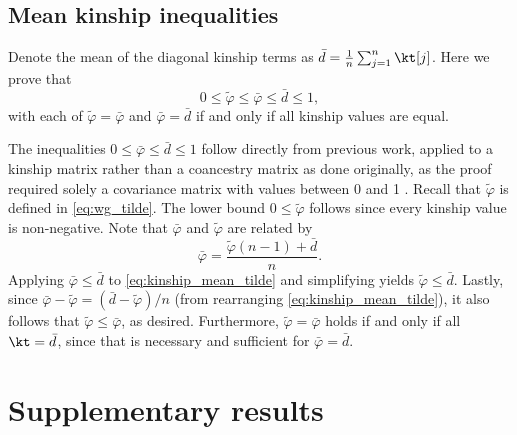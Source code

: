 \documentclass[11pt]{article}
\begin{document}
\begin{appendices}
  \section{Mean kinship inequalities}

  \label{sec:mean_kinship_ineqs}

  Denote the mean of the diagonal kinship terms as $\bar{d} = \frac{1}{n} \sum_{j=1}^n \kt[j]$.
  Here we prove that
  $$
  0 \le \tilde{\varphi} \le \bar{\varphi} \le \bar{d} \le 1,
  $$
  with each of $\tilde{\varphi} = \bar{\varphi}$ and $\bar{\varphi}= \bar{d}$ if and only if all kinship values are equal.

  The inequalities $0 \le \bar{\varphi} \le \bar{d} \le 1$ follow directly from previous work, applied to a kinship matrix rather than a coancestry matrix as done originally, as the proof required solely a covariance matrix with values between 0 and 1 \citep{ochoa_estimating_2021}.
  Recall that $\tilde{\varphi}$ is defined in \cref{eq:wg_tilde}.
  The lower bound $0 \le \tilde{\varphi}$ follows since every kinship value is non-negative.
  Note that $\bar{\varphi}$ and $\tilde{\varphi}$ are related by
  \begin{equation}
    \label{eq:kinship_mean_tilde}
    \bar{\varphi}
    =
    \frac{ \tilde{\varphi}(n-1) + \bar{d} }{n}.
  \end{equation}
  Applying $\bar{\varphi} \le \bar{d}$ to \cref{eq:kinship_mean_tilde} and simplifying yields $\tilde{\varphi} \le \bar{d}$.
  Lastly, since $\bar{\varphi} - \tilde{\varphi} = ( \bar{d}-\tilde{\varphi} ) / n$ (from rearranging \cref{eq:kinship_mean_tilde}), it also follows that $\tilde{\varphi} \le \bar{\varphi}$, as desired.
  Furthermore, $\tilde{\varphi} = \bar{\varphi}$ holds if and only if all $\kt = \bar{d}$, since that is necessary and sufficient for $\bar{\varphi} = \bar{d}$.

\end{appendices}


\section{Supplementary results}
\end{document}
